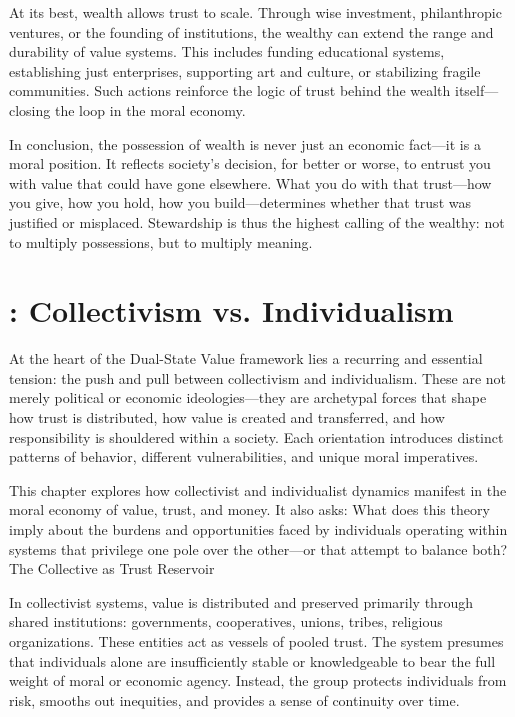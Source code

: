 \documentclass[11pt,oneside]{book}
\begin{document}
At its best, wealth allows trust to scale. Through wise investment, philanthropic ventures, or the founding of institutions, the wealthy can extend the range and durability of value systems. This includes funding educational systems, establishing just enterprises, supporting art and culture, or stabilizing fragile communities. Such actions reinforce the logic of trust behind the wealth itself—closing the loop in the moral economy.

In conclusion, the possession of wealth is never just an economic fact—it is a moral position. It reflects society’s decision, for better or worse, to entrust you with value that could have gone elsewhere. What you do with that trust—how you give, how you hold, how you build—determines whether that trust was justified or misplaced. Stewardship is thus the highest calling of the wealthy: not to multiply possessions, but to multiply meaning.


\chapter{: Collectivism vs. Individualism}

At the heart of the Dual-State Value framework lies a recurring and essential tension: the push and pull between collectivism and individualism. These are not merely political or economic ideologies—they are archetypal forces that shape how trust is distributed, how value is created and transferred, and how responsibility is shouldered within a society. Each orientation introduces distinct patterns of behavior, different vulnerabilities, and unique moral imperatives.

This chapter explores how collectivist and individualist dynamics manifest in the moral economy of value, trust, and money. It also asks: What does this theory imply about the burdens and opportunities faced by individuals operating within systems that privilege one pole over the other—or that attempt to balance both?
The Collective as Trust Reservoir

In collectivist systems, value is distributed and preserved primarily through shared institutions: governments, cooperatives, unions, tribes, religious organizations. These entities act as vessels of pooled trust. The system presumes that individuals alone are insufficiently stable or knowledgeable to bear the full weight of moral or economic agency. Instead, the group protects individuals from risk, smooths out inequities, and provides a sense of continuity over time.
\end{document}
